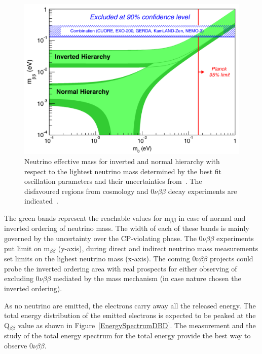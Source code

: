 \documentclass[main.tex]{subfiles}
\begin{document}
\begin{figure}[h!]
\begin{center}
\includegraphics[scale=0.35]{pictures/Chap2/m1NuMassContours2sigma_v4.png}
\caption{Neutrino effective mass for inverted and normal hierarchy with respect to the lightest neutrino mass determined by the best fit oscillation parameters and their uncertainties from~\cite{GlobalFitNeutrinoParameter}. The disfavoured regions from cosmology and 0$\nu\beta\beta$ decay experiments are indicated~\cite{MeffVsM0}.}
\label{EffectiveMassNMM}
\end{center}
\end{figure}


\NI The green bands represent the reachable values for m$_{\beta\beta}$ in case of normal and inverted ordering of neutrino mass. The width of each of these bands is mainly governed by the uncertainty over the CP-violating phase. The 0$\nu\beta\beta$ experiments put limit on m$_{\beta\beta}$ (y-axis), during direct and indirect neutrino mass measurements set limits on the lighest neutrino mass (x-axis). The coming 0$\nu\beta\beta$ projects could probe the inverted ordering area with real prospects for either observing of excluding 0$\nu\beta\beta$ mediated by the mass mechanism (in case nature chosen the inverted ordering).


\bigskip


\NI As no neutrino are emitted, the electrons carry away all the released energy. The total energy distribution of the emitted electrons is expected to be peaked at the Q$_{\beta\beta}$ value as shown in Figure~\ref{EnergySpectrumDBD}. The measurement and the study of the total energy spectrum for the total energy provide the best way to observe 0$\nu\beta\beta$.
\end{document}
